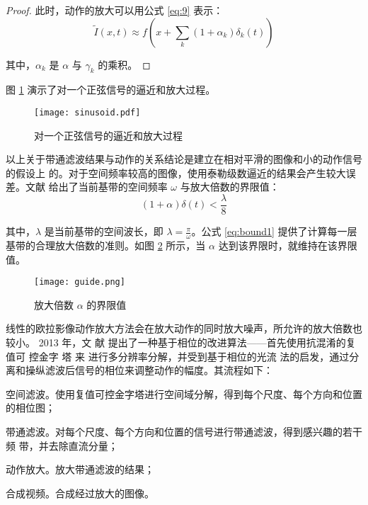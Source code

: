 \begin{proof}
此时，动作的放大可以用公式 \ref{eq:9} 表示：
\begin{equation}
  \label{eq:9}
  \tilde {I}(x,t)\approx f(x+\sum_k(1+\alpha_{k})\delta_{k}(t))
\end{equation}

其中，$\alpha_k$ 是 $\alpha$ 与 $\gamma_{k}$ 的乘积。
\end{proof}

图 \ref{fig:sinusoid} 演示了对一个正弦信号的逼近和放大过程。

\begin{figure}[htbp]
  \centering
  \texttt{[image: sinusoid.pdf]}
  \caption{对一个正弦信号的逼近和放大过程}
  \label{fig:sinusoid}
\end{figure}

以上关于带通滤波结果与动作的关系结论是建立在相对平滑的图像和小的动作信号的假设上
的。对于空间频率较高的图像，使用泰勒级数逼近的结果会产生较大误差。文献
\cite{wu2012eulerian}给出了当前基带的空间频率 $\omega$ 与放大倍数的界限值：
\begin{equation}
  \label{eq:bound1}
  (1+\alpha)\delta(t)<\frac{\lambda}{8}
\end{equation}

其中，$\lambda$ 是当前基带的空间波长，即 $\lambda=\frac{\pi}{\omega}$。公式
\ref{eq:bound1} 提供了计算每一层基带的合理放大倍数的准则。如图 \ref{fig:guide}
所示，当 $\alpha$ 达到该界限时，就维持在该界限值。

\clearpage

\begin{figure}[htbp]
  \centering
  \texttt{[image: guide.png]}
  \caption{放大倍数 $\alpha$ 的界限值}
  \label{fig:guide}
\end{figure}

线性的欧拉影像动作放大方法会在放大动作的同时放大噪声，所允许的放大倍数也较小。
2013 年，文
献\cite{Wadhwa2013PhaseBased} 提出了一种基于相位的改进算法——首先使用抗混淆的复值可
控金字
塔
来
进行多分辨率分解，并受到基于相位的光流
法的启发，通过分
离和操纵滤波后信号的相位来调整动作的幅度。其流程如下：

\begin{compactenum}
\item 空间滤波。使用复值可控金字塔进行空间域分解，得到每个尺度、每个方向和位置的相位图；
\item 带通滤波。对每个尺度、每个方向和位置的信号进行带通滤波，得到感兴趣的若干频
  带，并去除直流分量；
\item 动作放大。放大带通滤波的结果；
\item 合成视频。合成经过放大的图像。
\end{compactenum}

